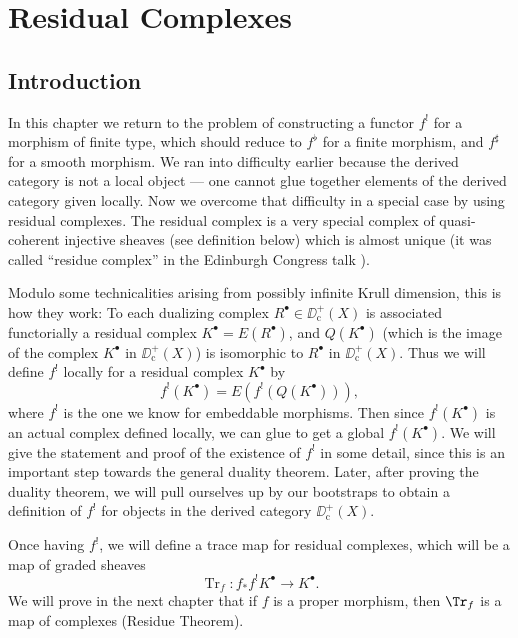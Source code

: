 
\chapter{Residual Complexes}
\setcounter{section}{-1}
\begingroup
\setlength{\emergencystretch}{2em}

\section{Introduction}\label{sec:6.0}

In this chapter we return to the problem of constructing a functor $f^{!}$ for a morphism of finite type, which should reduce to $f^{\flat}$ for a finite morphism, and $f^{\sharp}$ for a smooth morphism. We ran into difficulty earlier  because the derived category is not a local object — one cannot glue together elements of the derived category given locally. Now we overcome that difficulty in a special case by using residual complexes. The residual complex is a very special complex of quasi-coherent injective sheaves (see definition below) which is almost unique (it was called ``residue complex'' in the Edinburgh Congress talk \cite{9}).

Modulo some technicalities arising from possibly infinite Krull dimension, this is how they work: To each dualizing complex $R^\bullet\in\DD^+_{\mathrm{c}}(X)$ is associated functorially a residual complex $K^\bullet = E(R^\bullet)$, and $Q(K^\bullet)$ (which is the image of the complex $K^\bullet$ in $\DD^+_{\mathrm{c}}(X)$) is isomorphic to $R^\bullet$ in $\DD^+_{\mathrm{c}}(X)$. Thus we will define $f^{!}$ locally for a residual complex $K^\bullet$ by
\[
f^{!}(K^\bullet) = E(f^{!}(Q(K^\bullet))),
\]
where $f^{!}$ is the one we know for embeddable morphisms. Then since $f^{!}(K^\bullet)$ is an actual complex defined locally, we can glue to get a global $f^{!}(K^\bullet)$. We will give the statement and proof of the existence of $f^{!}$ in some detail, since this is an important step towards the general duality theorem. Later, after proving the duality theorem, we will pull ourselves up by our bootstraps to obtain a definition of $f^{!}$ for objects in the derived category $\DD_{\mathrm{c}}^{+}(X)$.

Once having $f^{!}$, we will define a trace map for residual complexes, which will be a map of graded sheaves
\[
\operatorname{Tr}_{f}\colon f_{*}f^{!}K^{\bullet}\longrightarrow K^{\bullet}.
\]
We will prove in the next chapter that if $f$ is a proper morphism, then $\Tr_f$ is a map of complexes (Residue Theorem).

